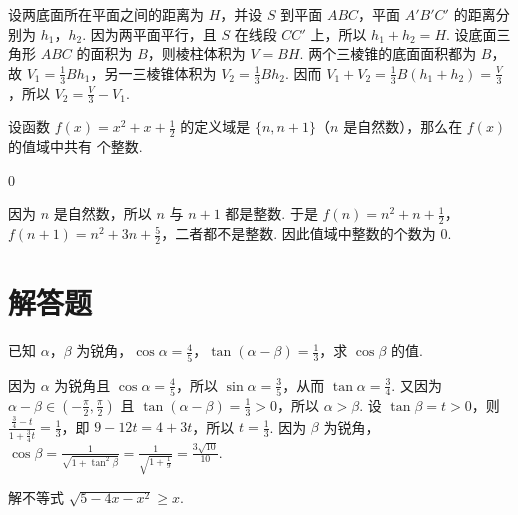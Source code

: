 \begin{solution}
设两底面所在平面之间的距离为 \(H\)，并设 \(S\) 到平面 \(ABC\)，平面 \(A'B'C'\) 的距离分别为 \(h_1\)，\(h_2\). 因为两平面平行，且 \(S\) 在线段 \(CC'\) 上，所以 \(h_1+h_2=H\). 设底面三角形 \(ABC\) 的面积为 \(B\)，则棱柱体积为 \(V=BH\). 两个三棱锥的底面面积都为 \(B\)，故 \(V_1=\frac{1}{3}Bh_1\)，另一三棱锥体积为 \(V_2=\frac{1}{3}Bh_2\). 因而 \(V_1+V_2=\frac{1}{3}B(h_1+h_2)=\frac{V}{3}\)，所以 \(V_2=\frac{V}{3}-V_1\).
\end{solution}

\begin{problem}
设函数 \(f(x)=x^2+x+\frac{1}{2}\) 的定义域是 \(\{n,n+1\}\)（\(n\) 是自然数），那么在 \(f(x)\) 的值域中共有\fillinblank{} 个整数.
\end{problem}

\begin{answer}
\(0\)
\end{answer}

\begin{solution}
因为 \(n\) 是自然数，所以 \(n\) 与 \(n+1\) 都是整数. 于是 \(f(n)=n^2+n+\frac{1}{2}\)，\(f(n+1)=n^2+3n+\frac{5}{2}\)，二者都不是整数. 因此值域中整数的个数为 \(0\).
\end{solution}

\section{解答题}

\begin{problem}
已知 \(\alpha\)，\(\beta\) 为锐角，\(\cos \alpha=\frac{4}{5}\)，\(\tan(\alpha-\beta)=\frac{1}{3}\)，求 \(\cos \beta\) 的值.
\end{problem}

\begin{solution}
因为 \(\alpha\) 为锐角且 \(\cos\alpha=\frac{4}{5}\)，所以 \(\sin\alpha=\frac{3}{5}\)，从而 \(\tan\alpha=\frac{3}{4}\). 又因为 \(\alpha-\beta\in\left(-\frac{\pi}{2},\frac{\pi}{2}\right)\) 且 \(\tan(\alpha-\beta)=\frac{1}{3}>0\)，所以 \(\alpha>\beta\). 设 \(\tan\beta=t>0\)，则
\(\frac{\frac{3}{4}-t}{1+\frac{3}{4}t}=\frac{1}{3}\)，即 \(9-12t=4+3t\)，所以 \(t=\frac{1}{3}\). 因为 \(\beta\) 为锐角，\(\cos\beta=\frac{1}{\sqrt{1+\tan^2\beta}}=\frac{1}{\sqrt{1+\frac{1}{9}}}=\frac{3\sqrt{10}}{10}\).
\end{solution}

\begin{problem}
解不等式 \(\sqrt{5-4x-x^2}\geqslant x\).
\end{problem}

